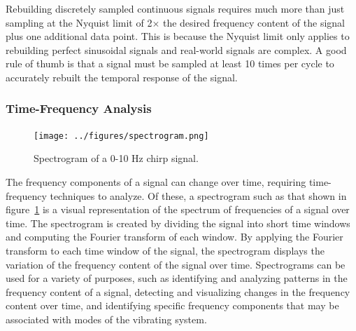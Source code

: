 \documentclass[12pt,letter]{article}
\begin{document}
Rebuilding discretely sampled continuous signals requires much more than just sampling at the Nyquist limit of 2$\times$ the desired frequency content of the signal plus one additional data point. This is because the Nyquist limit only applies to rebuilding perfect sinusoidal signals and real-world signals are complex. A good rule of thumb is that a signal must be sampled at least 10 times per cycle to accurately rebuilt the temporal response of the signal.

\subsubsection{Time-Frequency Analysis}


\begin{figure}[H]
    \centering
    \texttt{[image: ../figures/spectrogram.png]}
    \caption{Spectrogram of a 0-10 Hz chirp signal.}
    \label{fig:spectrogram}
\end{figure}

The frequency components of a signal can change over time, requiring time-frequency techniques to analyze. Of these, a spectrogram such as that shown in figure~\ref{fig:spectrogram} is a visual representation of the spectrum of frequencies of a signal over time. The spectrogram is created by dividing the signal into short time windows and computing the Fourier transform of each window.  By applying the Fourier transform to each time window of the signal, the spectrogram displays the variation of the frequency content of the signal over time. Spectrograms can be used for a variety of purposes, such as identifying and analyzing patterns in the frequency content of a signal, detecting and visualizing changes in the frequency content over time, and identifying specific frequency components that may be associated with modes of the vibrating system.





\end{document}
